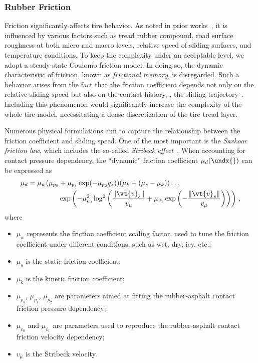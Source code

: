 
\subsubsection{Rubber Friction}
\label{app3:sec:rubber_friction}

Friction significantly affects tire behavior. As noted in prior works~\cite{selig2014rubber, savkoor1965friction, savkoor1987dry, tiwari2017rubber}, it is influenced by various factors such as tread rubber compound, road surface roughness at both micro and macro levels, relative speed of sliding surfaces, and temperature conditions. To keep the complexity under an acceptable level, we adopt a steady-state Coulomb friction model. In doing so, the dynamic characteristic of friction,  known as \emph{frictional memory}, is disregarded. Such a behavior arises from the fact that the friction coefficient depends not only on the relative sliding speed but also on the contact history, \ie{}, the sliding trajectory~\cite{persson2010rubber}. Including this phenomenon would significantly increase the complexity of the whole tire model, necessitating a dense discretization of the tire tread layer.

Numerous physical formulations aim to capture the relationship between the friction coefficient and sliding speed. One of the most important is the \emph{Savkoor friction law}, which includes the so-called \emph{Stribeck effect}~\cite{savkoor1965friction, savkoor1966some, savkoor1987dry}. When accounting for contact pressure dependency, the ``dynamic'' friction coefficient $\mu_d(\undx{})$ can be expressed as
%
\begin{align*}
  \mu_d = \mu_w (\mu_{p_0} &+ \mu_{p_1} \exp( -\mu_{p_2} q_z )) (\mu_k + (\mu_s - \mu_k)) \dots \\
  &\exp\left( -\mu_{v_0}^2 \log^2 \left( \dfrac{\|\vt{v}_s\|}{v_\mu} + \mu_{v_1} \exp\left(-\dfrac{\|\vt{v}_s\|}{v_\mu}\right)\right)\right) \, \text{,}
\end{align*}
%
where
%
\begin{itemize}
  \setlength{\itemsep}{0.0em}
  \item $\mu_w$ represents the friction coefficient scaling factor, used to tune the friction coefficient under different conditions, such as wet, dry, icy, etc.;
  \item $\mu_s$ is the static friction coefficient;
  \item $\mu_k$ is the kinetic friction coefficient;
  \item $\mu_{p_0}$, $\mu_{p_1}$, $\mu_{p_2}$ are parameters aimed at fitting the rubber-asphalt contact friction pressure dependency;
  \item $\mu_{v_0}$ and $\mu_{v_1}$ are parameters used to reproduce the rubber-asphalt contact friction velocity dependency;
  \item $v_\mu$ is the Stribeck velocity.
\end{itemize}

